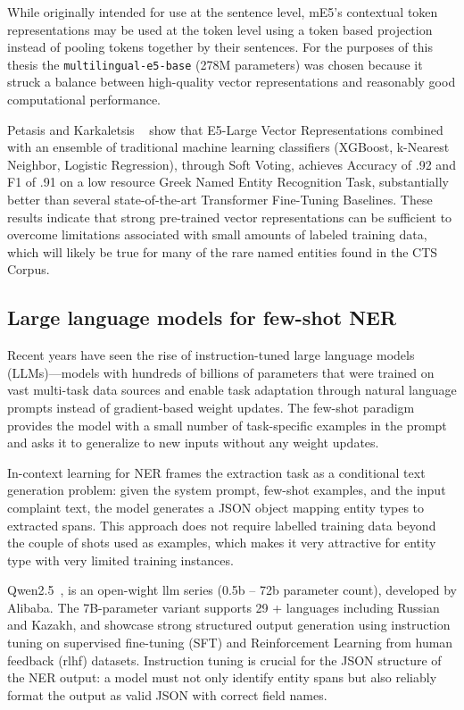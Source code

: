 While originally intended for use at the sentence level, mE5's contextual token representations may be used at the token level using a token based projection instead of pooling tokens together by their sentences. For the purposes of this thesis the \texttt{multilingual-e5-base} (278M parameters) was chosen because it struck a balance between high-quality vector representations and reasonably good computational performance.

Petasis and Karkaletsis ~\cite{petasis2024greek} show that E5-Large Vector Representations combined with an ensemble of traditional machine learning classifiers (XGBoost, k-Nearest Neighbor, Logistic Regression), through Soft Voting, achieves Accuracy of .92 and F1 of .91 on a low resource Greek Named Entity Recognition Task, substantially better than several state-of-the-art Transformer Fine-Tuning Baselines. These results indicate that strong pre-trained vector representations can be sufficient to overcome limitations associated with small amounts of labeled training data, which will likely be true for many of the rare named entities found in the CTS Corpus.

\subsection{Large language models for few-shot NER}
\label{sec:llm_ner}

Recent years have seen the rise of instruction-tuned large language models (LLMs)—models with hundreds of billions of parameters that were trained on vast multi-task data sources and enable task adaptation through natural language prompts instead of gradient-based weight updates. The few-shot paradigm ~\cite{yang2023survey} provides the model with a small number of task-specific examples in the prompt and asks it to generalize to new inputs without any weight updates.

In-context learning for NER frames the extraction task as a conditional text generation problem: given the system prompt, few-shot examples, and the input complaint text, the model generates a JSON object mapping entity types to extracted spans. This approach does not require labelled training data beyond the couple of shots used as examples, which makes it very attractive for entity type with very limited training instances.

Qwen2.5~\cite{yang2024qwen}, is an open-wight llm series (0.5b – 72b parameter count), developed by Alibaba. The 7B-parameter variant supports 29 + languages including Russian and Kazakh, and showcase strong structured output generation using instruction tuning on supervised fine-tuning (SFT) and Reinforcement Learning from human feedback (rlhf) datasets. Instruction tuning is crucial for the JSON structure of the NER output: a model must not only identify entity spans but also reliably format the output as valid JSON with correct field names.

